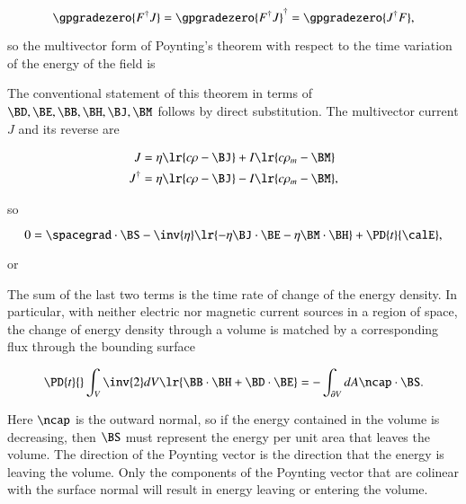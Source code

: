 \begin{equation}\label{eqn:poyntingF:1000}
\gpgradezero{ F^\dagger J }
=
\gpgradezero{ F^\dagger J }^\dagger
=
\gpgradezero{ J^\dagger F },
\end{equation}

so the
multivector form of Poynting's theorem with respect to the time variation of the energy of the field is


The conventional statement of this theorem in terms of \( \BD, \BE, \BB, \BH, \BJ, \BM \) follows by direct substitution.
The multivector current \( J \) and its reverse are

\begin{dmath}\label{eqn:poyntingF:160}
\begin{aligned}
J &= \eta \lr{ c \rho - \BJ } + I \lr{ c \rho_m - \BM } \\
J^\dagger &= \eta \lr{ c \rho - \BJ } - I \lr{ c \rho_m - \BM },
\end{aligned}
\end{dmath}

so

\begin{dmath}\label{eqn:poyntingF:180}
0 =
\spacegrad \cdot \BS
-
\inv{\eta}
\lr{
- \eta \BJ \cdot \BE
- \eta \BM \cdot \BH
}
+ \PD{t}{\calE},
\end{dmath}

or

The sum of the last two terms is the time rate of change of the energy density.
In particular,
with neither electric nor magnetic current sources in a region of space,
the change of energy density through a volume is matched by a corresponding flux through the bounding surface

\begin{dmath}\label{eqn:maxwellsEquations:740}
\PD{t}{} \int_V
\inv{2} dV \lr{
\BB \cdot \BH
+ \BD \cdot \BE
}
=
-\int_{\partial V} dA \ncap \cdot \BS.
\end{dmath}

Here \( \ncap \) is the outward normal, so if the energy contained in the volume is decreasing, then \( \BS \) must represent the energy per unit area that leaves the volume.
The direction of the Poynting vector is the direction that the energy is leaving the volume.
Only the components of the Poynting vector that are colinear with the surface normal will result in energy leaving or entering the volume.


